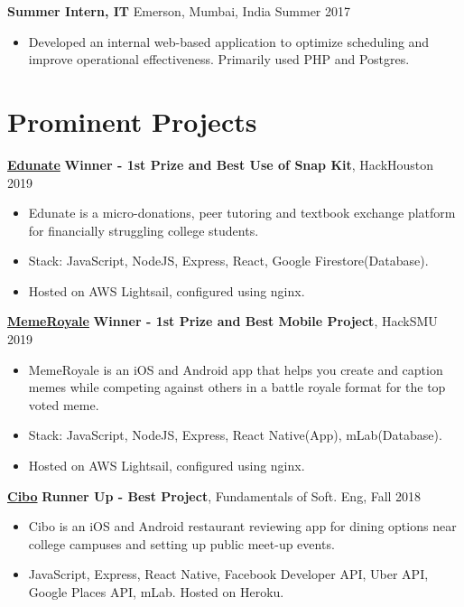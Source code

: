 \documentclass[margin]{res}
\begin{document}
\begin{resume}
{\bf Summer Intern, IT} Emerson, Mumbai, India \hfill  Summer 2017
\begin{itemize} \itemsep -2pt %
\item Developed an internal web-based application to optimize scheduling and improve operational effectiveness. Primarily used PHP and Postgres.
\end{itemize}


\section{Prominent Projects}
		{\bf \underline{Edunate}} {\bf Winner - 1st Prize and Best Use of Snap Kit}, HackHouston 2019  \hfill
                \begin{itemize} \itemsep -3pt
                 \item Edunate is a micro-donations, peer tutoring and textbook exchange platform for financially struggling college students.
		\item Stack: JavaScript, NodeJS, Express, React, Google Firestore(Database).
		\item Hosted on AWS Lightsail, configured using nginx.
		 \end{itemize}
 
		{\bf \underline{MemeRoyale}} {\bf Winner - 1st Prize and Best Mobile Project}, HackSMU 2019  \hfill
                \begin{itemize} \itemsep -3pt
                 \item  MemeRoyale is an iOS and Android app that helps you create and caption memes 
                 while competing against others in a battle royale format for the top voted meme.
                 \item Stack: JavaScript, NodeJS, Express, React Native(App), mLab(Database).
		\item Hosted on AWS Lightsail, configured using nginx.
		 \end{itemize}

         {\bf \underline{Cibo}} {\bf Runner Up - Best Project}, Fundamentals of Soft. Eng, Fall 2018\hfill
         \begin{itemize} \itemsep -3pt
          \item  Cibo is an iOS and Android restaurant reviewing app for dining options near college campuses and setting up public meet-up events.
	\item JavaScript, Express, React Native, Facebook Developer API, Uber API, Google Places API, mLab. Hosted on Heroku.
    

\end{itemize}
\end{resume}
\end{document}
